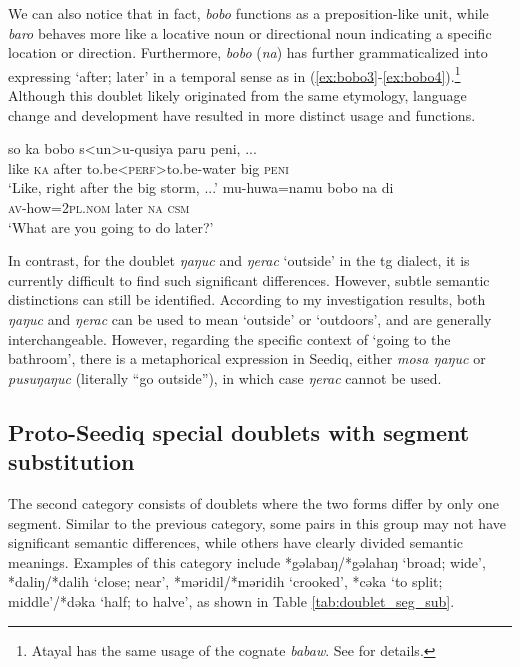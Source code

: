 We can also notice that in fact, \textit{bobo} functions as a preposition-like unit, while \textit{baro} behaves more like a locative noun or directional noun indicating a specific location or direction. Furthermore, \textit{bobo} (\textit{na}) has further grammaticalized into expressing `after; later' in a temporal sense as in (\ref{ex:bobo3}-\ref{ex:bobo4}).\footnote{Atayal has the same usage of the cognate \textit{babaw}. See \textcite{weng2012babaw} for details.} Although this doublet likely originated from the same etymology, language change and development have resulted in more distinct usage and functions.

\begin{exe}
    \ex 
    \begin{xlist}
        \ex \textcite{ILRDFEdict} \label{ex:bobo3}
        \gll so ka bobo s<un>u-qusiya paru peni, ... \\
        like \textsc{ka} after to.be<\textsc{\acs{perf}}>to.be-water big \textsc{peni}\\
        \glt `Like, right after the big storm, ...'
        \ex \textcite[132]{Sung2018Sedgrammar} \label{ex:bobo4}
        \gll mu-huwa=namu bobo na di \\
        \textsc{av}-how=2\textsc{pl.nom} later \textsc{na} \textsc{\acs{csm}} \\
        \glt `What are you going to do later?'
    \end{xlist}
\end{exe}

In contrast, for the doublet \textit{ŋaŋuc} and \textit{ŋerac} `outside' in the \acl{tg} dialect, it is currently difficult to find such significant differences. However, subtle semantic distinctions can still be identified. According to my investigation results, both \textit{ŋaŋuc} and \textit{ŋerac} can be used to mean `outside' or `outdoors', and are generally interchangeable. However, regarding the specific context of `going to the bathroom', there is a metaphorical expression in Seediq, either \textit{mosa ŋaŋuc} or \textit{pusuŋaŋuc} (literally ``go outside''), in which case \textit{ŋerac} cannot be used.

\subsection{Proto-Seediq special doublets with segment substitution}

The second category consists of doublets where the two forms differ by only one segment. Similar to the previous category, some pairs in this group may not have significant semantic differences, while others have clearly divided semantic meanings. Examples of this category include *gəlabaŋ/*gəlahaŋ `broad; wide', *daliŋ/*dalih `close; near', *məridil/*məridih `crooked', *cəka `to split; middle'/*dəka `half; to halve', as shown in Table \ref{tab:doublet_seg_sub}.

